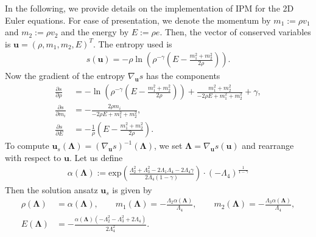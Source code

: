 In the following, we provide details on the implementation of IPM for the 2D Euler equations. For ease of presentation, we denote the momentum by $m_1 := \rho v_1$ and $m_2:=\rho v_2$ and the energy by $E:=\rho e$. Then, the vector of conserved variables is $\bm u = (\rho,m_1,m_2,E)^T$. The entropy used is
\begin{align*}
s(\bm u) = -\rho \ln \left(\rho^{-\gamma} \left(E - \frac{m_1^2 + m_2^2}{2
\rho}\right)\right).
\end{align*}
Now the gradient of the entropy $\nabla_{\bm u} s$ has the components
\begin{align*}
\frac{\partial s}{\partial \rho} &= -\ln \left(\rho^{-\gamma}\left(E-\frac{m_1^2+m_2^2}{2 \rho }\right)\right)+\frac{m_1^2+m_2^2}{-2 \rho  E+m_1^2+m_2^2}+\gamma, \\
\frac{\partial s}{\partial m_i} &= -\frac{2\rho  m_i}{-2 \rho  E+m_1^2+m_2^2}, \\
\frac{\partial s}{\partial E} &=-\frac1\rho\left(E-\frac{m_1^2+m_2^2}{2 \rho }\right).
\end{align*}
To compute $\bm u_s(\bm\Lambda) = (\nabla_{\bm u}s)^{-1}(\bm \Lambda)$, we set $\bm \Lambda = \nabla_{\bm u}s(\bm u)$ and rearrange with respect to $\bm u$. Let us define
\begin{align*}
\alpha(\bm\Lambda) := \text{exp}\left(\frac{ \Lambda_2^2 + \Lambda_3^2 - 2\Lambda_1  \Lambda_4 - 2 \Lambda_4  \gamma }{ 2 \Lambda_4(1-\gamma) } \right) \cdot (-\Lambda_4)^{\frac{1}{1-\gamma}}
\end{align*}
Then the solution ansatz $\bm u_s$ is given by
\begin{align*}
\rho(\bm\Lambda) &= \alpha(\bm\Lambda),\qquad m_1(\bm\Lambda) = -\frac{\Lambda_2 \alpha(\bm{\Lambda})}{\Lambda_4},\qquad m_2(\bm\Lambda) = -\frac{\Lambda_3 \alpha(\bm{\Lambda})}{\Lambda_4}, \\
E(\bm\Lambda) &= -\frac{  \alpha(\bm{\Lambda}) ( -\Lambda_2^2 - \Lambda_3^2 + 2\Lambda_4 ) }{ 2 \Lambda_4^2}.
\end{align*}
